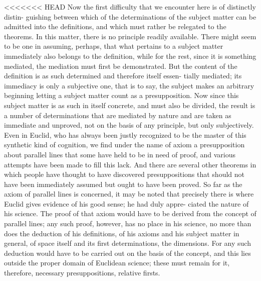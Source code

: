 <<<<<<< HEAD
Now the first difficulty that we encounter here is of distinctly distin-
guishing between which of the determinations of the subject matter can be
admitted into the definitions, and which must rather be relegated to the
theorems. In this matter, there is no principle readily available. There might
seem to be one in assuming, perhaps, that what pertains to a subject matter
immediately also belongs to the definition, while for the rest, since it is
something mediated, the mediation must first be demonstrated. But the
content of the definition is as such determined and therefore itself essen-
tially mediated; its immediacy is only a subjective one, that is to say, the
subject makes an arbitrary beginning letting a subject matter count as a
presupposition. Now since this subject matter is as such in itself concrete,
and must also be divided, the result is a number of determinations that
are mediated by nature and are taken as immediate and unproved, not on
the basis of any principle, but only subjectively.
Even in Euclid, who has
always been justly recognized to be the master of this synthetic kind of
cognition, we find under the name of axiom a presupposition about parallel
lines that some have held to be in need of proof, and various attempts have
been made to fill this lack. And there are several other theorems in which
people have thought to have discovered presuppositions that should not
have been immediately assumed but ought to have been proved. So far
as the axiom of parallel lines is concerned, it may be noted that precisely
there is where Euclid gives evidence of his good sense; he had duly appre-
ciated the nature of his science. The proof of that axiom would have to be
derived from the concept of parallel lines; any such proof, however, has no
place in his science, no more than does the deduction of his definitions,
of his axioms and his subject matter in general, of space itself and its first
determinations, the dimensions. For any such deduction would have to be
carried out on the basis of the concept, and this lies outside the proper
domain of Euclidean science; these must remain for it, therefore, necessary
presuppositions, relative firsts.


